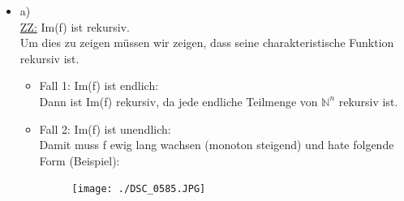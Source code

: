 \documentclass[a4paper]{scrartcl}%
\begin{document}
    \begin{itemize}
        \item a)\\
            \underline{ZZ:} Im(f) ist rekursiv.\\
            Um dies zu zeigen müssen wir zeigen, dass seine charakteristische Funktion rekursiv ist.\\
            \begin{itemize}
                \item Fall 1: Im(f) ist endlich:\\
                    Dann ist Im(f) rekursiv, da jede endliche Teilmenge von $ \mathds{N}^n$ rekursiv ist.\\
                \item Fall 2: Im(f) ist unendlich:\\
                    Damit muss f ewig lang wachsen (monoton steigend) und hate folgende Form (Beispiel):\\
                    \begin{figure}[H]
                        \centering
                        \texttt{[image: ./DSC\_0585.JPG]}
                        \label{fig:./DSC_0585}
                    \end{figure}


\end{itemize}
\end{itemize}
\end{document}
